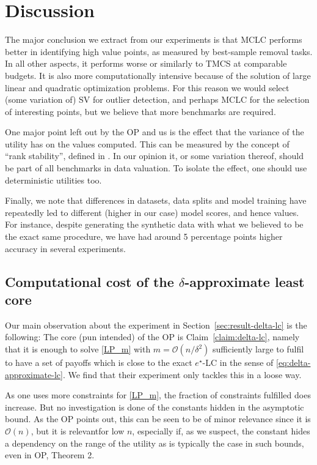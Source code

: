 \section{Discussion}

The major conclusion we extract from our experiments is that MCLC performs
better in identifying high value points, as measured by best-sample removal
tasks. In all other aspects, it performs worse or similarly to TMCS at
comparable budgets. It is also more computationally intensive because of the
solution of large linear and quadratic optimization problems. For this reason
we would select (some variation of) SV for outlier detection, and perhaps MCLC
for the selection of interesting points, but we believe that more benchmarks
are required.

One major point left out by the OP and us is the effect that the variance of
the utility has on the values computed. This can be measured by the concept of
``rank stability'', defined in {\cite{wang_data_2022}}. In our opinion it, or
some variation thereof, should be part of all benchmarks in data valuation. To
isolate the effect, one should use deterministic utilities too.

Finally, we note that differences in datasets, data splits and model training
have repeatedly led to different (higher in our case) model scores, and hence
values. For instance, despite generating the synthetic data with what we
believed to be the exact same procedure, we have had around 5 percentage
points higher accuracy in several experiments.

\subsection{Computational cost of the $\delta$-approximate least
core}\label{sec:validity-of-delta-lc-experiment}

Our main observation about the experiment in Section~\ref{sec:result-delta-lc}
is the following: The core (pun intended) of the OP is
Claim~\ref{claim:delta-lc}, namely that it is enough to solve \eqref{LP_m}
with $m =\mathcal{O} (n / \delta^2)$ sufficiently large to fulfil to have a
set of payoffs which is close to the exact $e^{\star}$-LC in the sense of
\eqref{eq:delta-approximate-lc}. We find that their experiment only tackles
this in a loose way.

As one uses more constraints for \eqref{LP_m}, the fraction of {}
constraints fulfilled does increase. But no investigation is done of the
constants hidden in the asymptotic bound. As the OP points out, this can be
seen to be of minor relevance since it is $\mathcal{O} (n)$, but it is
relevantfor low $n$, especially if, as we suspect, the constant hides a
dependency on the range of the utility as is typically the case in such
bounds, even in OP, Theorem 2.

